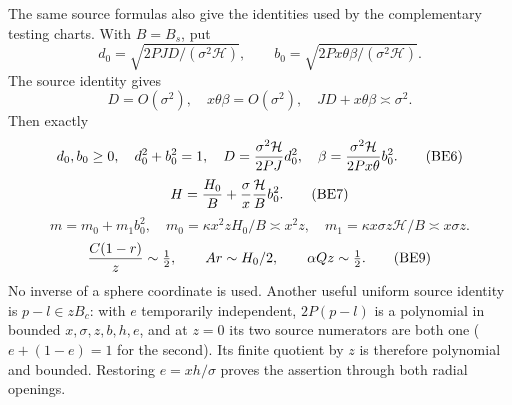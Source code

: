 \documentclass[10pt,a4paper]{article}
\begin{document}
The same source formulas also give the identities used by the
complementary testing charts. With $B=B_s$, put
\[
 d_0=\sqrt{2PJD/(\sigma^2\mathcal H)},\qquad
 b_0=\sqrt{2Px\theta\beta/(\sigma^2\mathcal H)}.
\]
The source identity gives
\[
 D=O(\sigma^2),\quad x\theta\beta=O(\sigma^2),\quad
 JD+x\theta\beta\asymp\sigma^2.\tag{BE5}
\]
Then exactly
\[
 d_0,b_0\ge0,\quad d_0^2+b_0^2=1,\quad
 D={\sigma^2\mathcal H\over2PJ}d_0^2,\quad
 \beta={\sigma^2\mathcal H\over2Px\theta}b_0^2.\tag{BE6}
\]
\[
 H={H_0\over B}+{\sigma\over x}{\mathcal H\over B}b_0^2.\tag{BE7}
\]
\[
 m=m_0+m_1b_0^2,\quad
 m_0=\kappa x^2zH_0/B\asymp x^2z,\quad
 m_1=\kappa x\sigma z\mathcal H/B\asymp x\sigma z.\tag{BE8}
\]
\[
 {C(1-r)\over z}\sim\tfrac12,\qquad
 Ar\sim H_0/2,\qquad \alpha Qz\sim\tfrac12.\tag{BE9}
\]
No inverse of a sphere coordinate is used. Another useful uniform
source identity is $p-l\in zB_c$: with $e$ temporarily independent,
$2P(p-l)$ is a polynomial in bounded $x,\sigma,z,b,h,e$, and
at $z=0$ its two source numerators are both one
($e+(1-e)=1$ for the second). Its finite quotient by $z$ is
therefore polynomial and bounded. Restoring $e=xh/\sigma$ proves
the assertion through both radial openings.
\end{document}
